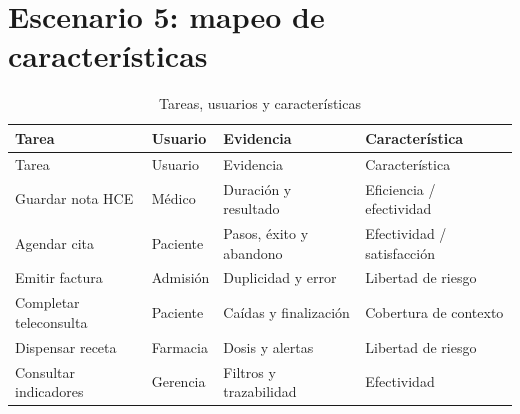 \chapter{Escenario 5: mapeo de características}

\begin{longtable}{p{}p{}p{}p{}}
\caption{Tareas, usuarios y características}\\\toprule
Tarea & Usuario & Evidencia & Característica\\\midrule\endfirsthead
\toprule Tarea & Usuario & Evidencia & Característica\\\midrule\endhead
Guardar nota HCE & Médico & Duración y resultado & Eficiencia / efectividad\\
Agendar cita & Paciente & Pasos, éxito y abandono & Efectividad / satisfacción\\
Emitir factura & Admisión & Duplicidad y error & Libertad de riesgo\\
Completar teleconsulta & Paciente & Caídas y finalización & Cobertura de contexto\\
Dispensar receta & Farmacia & Dosis y alertas & Libertad de riesgo\\
Consultar indicadores & Gerencia & Filtros y trazabilidad & Efectividad\\\bottomrule
\end{longtable}
